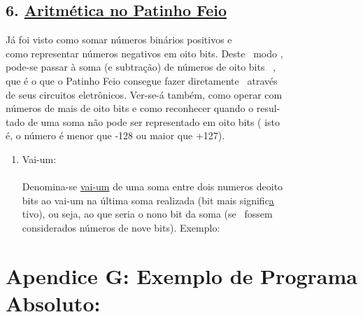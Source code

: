 \documentclass[a4paper,12pt]{article}
\begin{document}
\newpage

\subsection*{6. \uline{Aritmética no Patinho Feio}}

Já foi visto como somar números binários positivos e\\
como representar números negativos em oito bits. Deste \ modo ,\\
pode-se passar à soma (e subtração) de números de oito bits \ ,\\
que é o que o Patinho Feio consegue fazer diretamente \ através\\
de seus circuitos eletrônicos. Ver-se-á também, como operar com\\
números de mais de oito bits e como reconhecer quando o resul-\\
tado de uma soma não pode ser representado em oito bits ( isto\\
é, o número é menor que -128 ou maior que +127).\\

\begin{enumerate}[label=\alph*), align=left, leftmargin=1.5em, labelsep=-0.5em, itemsep=1em, topsep=1.5em]
\item Vai-um:\\
\\[-0.5em]
Denomina-se \uline{vai-um} de uma soma entre dois numeros de\hfill oito\\
bits ao vai-um na última soma realizada (bit mais signific\uline a\\
tivo), ou seja, ao que seria o nono bit da soma (se \ fossem\\
considerados números de nove bits). Exemplo:\\
\end{enumerate}


\section{Apendice G: Exemplo de Programa Absoluto:}
\end{document}
